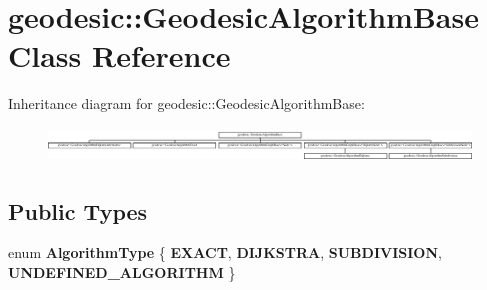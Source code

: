 \hypertarget{classgeodesic_1_1_geodesic_algorithm_base}{}\section{geodesic\+:\+:Geodesic\+Algorithm\+Base Class Reference}
\label{classgeodesic_1_1_geodesic_algorithm_base}
Inheritance diagram for geodesic\+:\+:Geodesic\+Algorithm\+Base\+:\begin{figure}[H]
\begin{center}
\leavevmode
\includegraphics[height=0.920548cm]{classgeodesic_1_1_geodesic_algorithm_base}
\end{center}
\end{figure}
\subsection*{Public Types}
\begin{DoxyCompactItemize}
\item 
\hypertarget{classgeodesic_1_1_geodesic_algorithm_base_a92b104ecfd6664bba6e3e6089e62a568}{}enum {\bfseries Algorithm\+Type} \{ {\bfseries E\+X\+A\+C\+T}, 
{\bfseries D\+I\+J\+K\+S\+T\+R\+A}, 
{\bfseries S\+U\+B\+D\+I\+V\+I\+S\+I\+O\+N}, 
{\bfseries U\+N\+D\+E\+F\+I\+N\+E\+D\+\_\+\+A\+L\+G\+O\+R\+I\+T\+H\+M}
 \}\label{classgeodesic_1_1_geodesic_algorithm_base_a92b104ecfd6664bba6e3e6089e62a568}

\end{DoxyCompactItemize}
